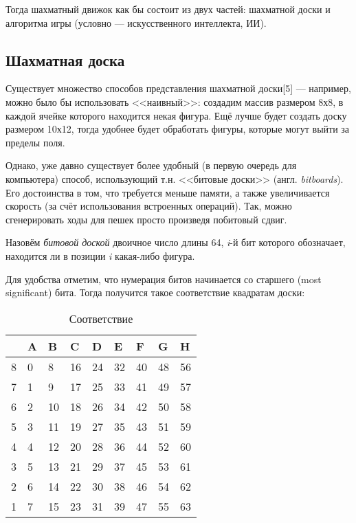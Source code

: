 {	Тогда шахматный движок как бы состоит из двух частей: шахматной доски и алгоритма игры (условно --- искусственного интеллекта, ИИ).
	
	\subsection{Шахматная доска}
	
	Существует множество способов представления шахматной доски[5] --- например, можно было бы использовать <<наивный>>: создадим массив размером 8х8, в каждой ячейке которого находится некая фигура. Ещё лучше будет создать доску размером 10х12, тогда удобнее будет обработать фигуры, которые могут выйти за пределы поля.
	
	Однако, уже давно существует более удобный (в первую очередь для компьютера) способ, использующий т.н. <<битовые доски>> (англ. \textit{bitboards}). Его достоинства в том, что требуется меньше памяти, а также увеличивается скорость (за счёт использования встроенных операций). Так, можно сгенерировать ходы для пешек просто произведя побитовый сдвиг.
	
	Назовём \textit{битовой доской} двоичное число длины 64, \textit{i}-й бит которого обозначает, находится ли в позиции \textit{i} какая-либо фигура.
	
	Для удобства отметим, что нумерация битов начинается со старшего (most significant) бита. Тогда получится такое соответствие квадратам доски:
	
	
	
	\begin{table}[h]
		\centering
		\caption{Соответствие}
		\label{tab: accord}
		\begin{tabular}{|l|l|l|l|l|l|l|l|l|}
			\hline
			  & A & B  & C  & D  & E  & F  & G  & H  \\ \hline
			8 & 0 & 8  & 16 & 24 & 32 & 40 & 48 & 56 \\ \hline
			7 & 1 & 9  & 17 & 25 & 33 & 41 & 49 & 57 \\ \hline
			6 & 2 & 10 & 18 & 26 & 34 & 42 & 50 & 58 \\ \hline
			5 & 3 & 11 & 19 & 27 & 35 & 43 & 51 & 59 \\ \hline
			4 & 4 & 12 & 20 & 28 & 36 & 44 & 52 & 60 \\ \hline
			3 & 5 & 13 & 21 & 29 & 37 & 45 & 53 & 61 \\ \hline
			2 & 6 & 14 & 22 & 30 & 38 & 46 & 54 & 62 \\ \hline
			1 & 7 & 15 & 23 & 31 & 39 & 47 & 55 & 63 \\ \hline
		\end{tabular}
	\end{table}
	
}
